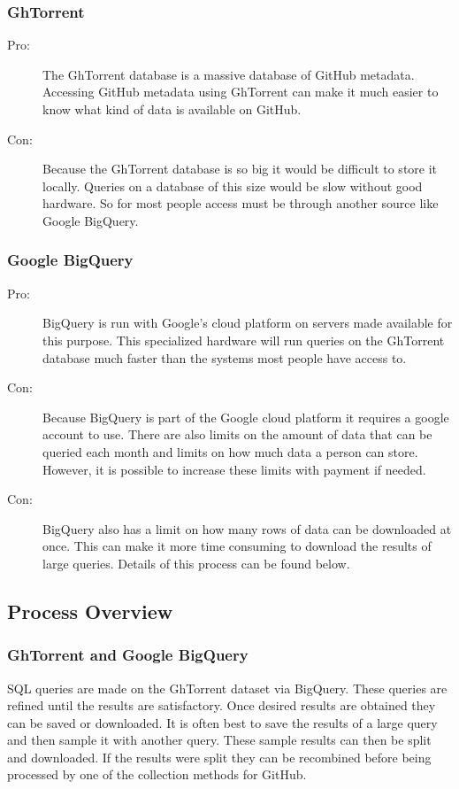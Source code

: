 \documentclass[12pt]{article}
\begin{document}
\subsubsection*{GhTorrent}
\begin{description}
    \item [Pro:] The GhTorrent database is a massive database of GitHub metadata. Accessing GitHub metadata using GhTorrent can make it much easier to know what kind of data is available on GitHub.
    
    \item [Con:] Because the GhTorrent database is so big it would be difficult to store it locally. Queries on a database of this size would be slow without good hardware. So for most people access must be through another source like Google BigQuery. 
\end{description}

\subsubsection*{Google BigQuery}
\begin{description}
    \item [Pro:] BigQuery is run with Google's cloud platform on servers made available for this purpose. This specialized hardware will run queries on the GhTorrent database much faster than the systems most people have access to.

    \item [Con:] Because BigQuery is part of the Google cloud platform it requires a google account to use. There are also limits on the amount of data that can be queried each month and limits on how much data a person can store. However, it is possible to increase these limits with payment if needed.

    \item [Con:] BigQuery also has a limit on how many rows of data can be downloaded at once. This can make it more time consuming to download the results of large queries. Details of this process can be found below.
\end{description}


\subsection{Process Overview}

\subsubsection*{GhTorrent and Google BigQuery}
SQL queries are made on the GhTorrent dataset via BigQuery. These queries are refined until the results are satisfactory. Once desired results are obtained they can be saved or downloaded. It is often best to save the results of a large query and then sample it with another query. These sample results can then be split and downloaded. If the results were split they can be recombined before being processed by one of the collection methods for GitHub.
\end{document}
